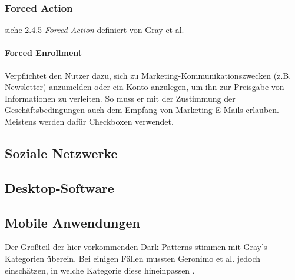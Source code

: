 \documentclass[a4paper]{article}
\begin{document}
\subsubsection{Forced Action}
siehe 2.4.5 \textit{Forced Action} definiert von Gray et al.

\paragraph{Forced Enrollment}
Verpflichtet den Nutzer dazu, sich zu Marketing-Kommunikationszwecken (z.B. Newsletter) anzumelden oder ein Konto anzulegen, um ihn zur Preisgabe von Informationen zu verleiten. So muss er mit der Zustimmung der Geschäftsbedingungen auch dem Empfang von Marketing-E-Mails erlauben. Meistens werden dafür Checkboxen verwendet.

\subsection{Soziale Netzwerke}
\label{sub:soziale_netzwerke}

\subsection{Desktop-Software}
\label{sub:desktop-software}

\subsection{Mobile Anwendungen}
\label{sub:mobile_anwendungen}
Der Großteil der hier vorkommenden Dark Patterns stimmen mit Gray's Kategorien überein. Bei einigen Fällen mussten Geronimo et al. jedoch einschätzen, in welche Kategorie diese hineinpassen \cite{geronimo}.
\end{document}
